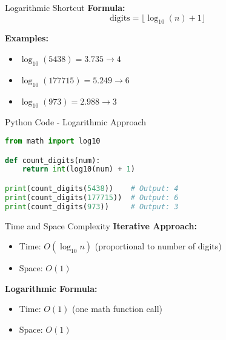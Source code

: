 \documentclass[aspectratio=169]{beamer}
\begin{document}
\begin{frame}{Logarithmic Shortcut}
\textbf{Formula:}
\[
\text{digits} = \lfloor \log_{10}(n) + 1 \rfloor
\]

\textbf{Examples:}
\begin{itemize}
  \item $\log_{10}(5438) = 3.735 \rightarrow 4$
  \item $\log_{10}(177715) = 5.249 \rightarrow 6$
  \item $\log_{10}(973) = 2.988 \rightarrow 3$
\end{itemize}
\end{frame}

\begin{frame}[fragile]{Python Code - Logarithmic Approach}
\begin{lstlisting}[language=Python]
from math import log10

def count_digits(num):
    return int(log10(num) + 1)

print(count_digits(5438))    # Output: 4
print(count_digits(177715))  # Output: 6
print(count_digits(973))     # Output: 3
\end{lstlisting}
\end{frame}

\begin{frame}{Time and Space Complexity}
\textbf{Iterative Approach:}
\begin{itemize}
  \item Time: $O(\log_{10} n)$ (proportional to number of digits)
  \item Space: $O(1)$
\end{itemize}
\textbf{Logarithmic Formula:}
\begin{itemize}
  \item Time: $O(1)$ (one math function call)
  \item Space: $O(1)$
\end{itemize}
\end{frame}
\end{document}
